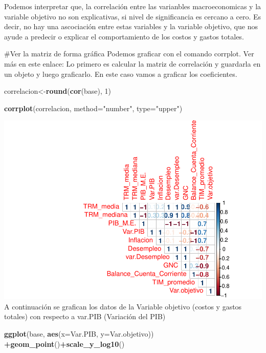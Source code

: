 \documentclass[
  11pt,
]{article}
\newenvironment{Shaded}{\begin{snugshade}}{\end{snugshade}}
\newcommand{\DataTypeTok}[1]{\textcolor[rgb]{0.13,0.29,0.53}{#1}}
\newcommand{\DecValTok}[1]{\textcolor[rgb]{0.00,0.00,0.81}{#1}}
\newcommand{\KeywordTok}[1]{\textcolor[rgb]{0.13,0.29,0.53}{\textbf{#1}}}
\newcommand{\NormalTok}[1]{#1}
\newcommand{\OperatorTok}[1]{\textcolor[rgb]{0.81,0.36,0.00}{\textbf{#1}}}
\newcommand{\StringTok}[1]{\textcolor[rgb]{0.31,0.60,0.02}{#1}}
\begin{document}
Podemos interpretar que, la correlación entre las varianbles
macroeconomicas y la variable objetivo no son explicativas, si nivel de
significancia es cercano a cero. Es decir, no hay una ascociación entre
estas variables y la variable objetivo, que nos ayude a predecir o
explicar el comportamiento de los costos y gastos totales.

\#Ver la matriz de forma gráfica Podemos graficar con el comando
corrplot. Ver más en este enlace: Lo primero es calcular la matriz de
correlación y guardarla en un objeto y luego graficarlo. En este caso
vamos a graficar los coeficientes.

\begin{Shaded}
\begin{Highlighting}[]
\NormalTok{correlacion<-}\KeywordTok{round}\NormalTok{(}\KeywordTok{cor}\NormalTok{(base), }\DecValTok{1}\NormalTok{)}

\KeywordTok{corrplot}\NormalTok{(correlacion, }\DataTypeTok{method=}\StringTok{"number"}\NormalTok{, }\DataTypeTok{type=}\StringTok{"upper"}\NormalTok{)}
\end{Highlighting}
\end{Shaded}

\includegraphics{index_files/figure-latex/unnamed-chunk-43-1.pdf} A
continuación se grafican los datos de la Variable objetivo (costos y
gastos totales) con respecto a var.PIB (Variación del PIB)

\begin{Shaded}
\begin{Highlighting}[]
\KeywordTok{ggplot}\NormalTok{(base, }\KeywordTok{aes}\NormalTok{(}\DataTypeTok{x=}\NormalTok{Var.PIB, }\DataTypeTok{y=}\NormalTok{Var.objetivo)) }\OperatorTok{+}\KeywordTok{geom_point}\NormalTok{()}\OperatorTok{+}\KeywordTok{scale_y_log10}\NormalTok{()}
\end{Highlighting}
\end{Shaded}
\end{document}
